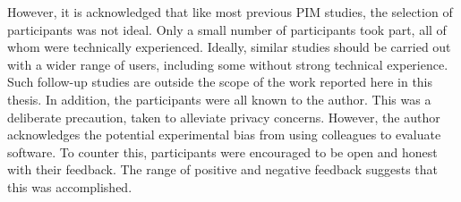 However, it is acknowledged that like most previous PIM studies, the selection of participants was not ideal.  Only a small number of participants took part, all of whom were technically experienced. 
Ideally, similar studies should be carried out with a wider range of users, including some without strong technical experience. Such follow-up studies are outside the scope of the work reported here in this thesis.  
In addition, the participants were all known to the author.  This was a deliberate precaution, taken to alleviate privacy concerns.  However, the author acknowledges the potential experimental bias from using colleagues to evaluate software.  To counter this, participants were encouraged to be open and honest with their feedback.  The range of positive and negative feedback suggests that this was accomplished.









